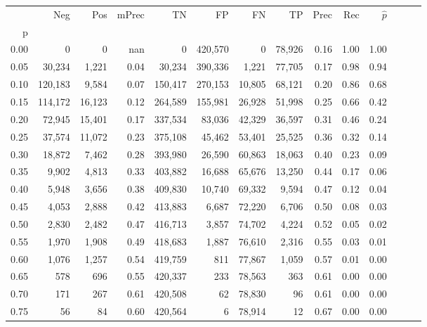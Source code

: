\begin{tabular}{rrrrrrrrrrrrrr}
\toprule
{} &      Neg &     Pos & mPrec &       TN &       FP &      FN &      TP &  Prec &   Rec & $\hat{p}$ \\
p    &          &         &       &          &          &         &         &       &       &           \\
\midrule
0.00 &        0 &       0 &   nan &        0 &  420,570 &       0 &  78,926 &  0.16 &  1.00 &      1.00 \\
0.05 &   30,234 &   1,221 &  0.04 &   30,234 &  390,336 &   1,221 &  77,705 &  0.17 &  0.98 &      0.94 \\
0.10 &  120,183 &   9,584 &  0.07 &  150,417 &  270,153 &  10,805 &  68,121 &  0.20 &  0.86 &      0.68 \\
0.15 &  114,172 &  16,123 &  0.12 &  264,589 &  155,981 &  26,928 &  51,998 &  0.25 &  0.66 &      0.42 \\
0.20 &   72,945 &  15,401 &  0.17 &  337,534 &   83,036 &  42,329 &  36,597 &  0.31 &  0.46 &      0.24 \\
0.25 &   37,574 &  11,072 &  0.23 &  375,108 &   45,462 &  53,401 &  25,525 &  0.36 &  0.32 &      0.14 \\
0.30 &   18,872 &   7,462 &  0.28 &  393,980 &   26,590 &  60,863 &  18,063 &  0.40 &  0.23 &      0.09 \\
0.35 &    9,902 &   4,813 &  0.33 &  403,882 &   16,688 &  65,676 &  13,250 &  0.44 &  0.17 &      0.06 \\
0.40 &    5,948 &   3,656 &  0.38 &  409,830 &   10,740 &  69,332 &   9,594 &  0.47 &  0.12 &      0.04 \\
0.45 &    4,053 &   2,888 &  0.42 &  413,883 &    6,687 &  72,220 &   6,706 &  0.50 &  0.08 &      0.03 \\
0.50 &    2,830 &   2,482 &  0.47 &  416,713 &    3,857 &  74,702 &   4,224 &  0.52 &  0.05 &      0.02 \\
0.55 &    1,970 &   1,908 &  0.49 &  418,683 &    1,887 &  76,610 &   2,316 &  0.55 &  0.03 &      0.01 \\
0.60 &    1,076 &   1,257 &  0.54 &  419,759 &      811 &  77,867 &   1,059 &  0.57 &  0.01 &      0.00 \\
0.65 &      578 &     696 &  0.55 &  420,337 &      233 &  78,563 &     363 &  0.61 &  0.00 &      0.00 \\
0.70 &      171 &     267 &  0.61 &  420,508 &       62 &  78,830 &      96 &  0.61 &  0.00 &      0.00 \\
0.75 &       56 &      84 &  0.60 &  420,564 &        6 &  78,914 &      12 &  0.67 &  0.00 &      0.00 \\

\end{tabular}
